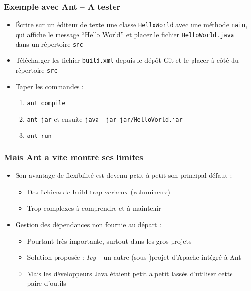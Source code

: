 \documentclass{beamer}
\begin{document}
\begin{frame}[fragile]
  \frametitle{Exemple avec Ant -- A tester}
  \begin{itemize}
  \item Écrire sur un éditeur de texte une classe \texttt{HelloWorld}
    avec une méthode \texttt{main}, qui affiche le message ``Hello
    World'' et placer le fichier \texttt{HelloWorld.java} dans un
    répertoire \texttt{src}
  \item Télécharger les fichier \texttt{build.xml} depuis le dépôt Git et le
    placer à côté du répertoire \texttt{src}
  \item Taper les commandes :
\begin{enumerate}
\item \texttt{ant compile}
\item \texttt{ant jar} et ensuite \texttt{java -jar jar/HelloWorld.jar}
\item \texttt{ant run}
\end{enumerate}  
\end{itemize}

\end{frame}

\begin{frame}[fragile]
  \frametitle{Mais Ant a vite montré ses limites}
\begin{itemize}
\item Son avantage de flexibilité est devenu petit à petit son
  principal défaut :
  \begin{itemize}
  \item Des fichiers de build trop verbeux (volumineux)
  \item Trop complexes à comprendre et à maintenir
  \end{itemize}
\item Gestion des dépendances non fournie au départ :
  \begin{itemize}
  \item Pourtant très importante, surtout dans les gros projets
  \item Solution proposée : \textit{Ivy} -- un autre (sous-)projet
    d'Apache intégré à Ant
  \item Mais les développeurs Java étaient petit à petit lassés
    d'utiliser cette paire d'outils
  \end{itemize}    
\end{itemize}
\end{frame}
\end{document}
